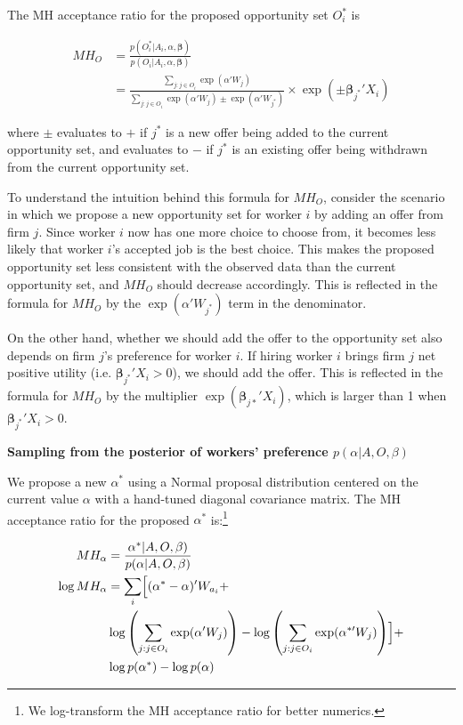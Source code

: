 The MH acceptance ratio for the proposed opportunity set $O_i^*$ is

\begin{align}
  MH_O &= \frac{p(O_i^* | A_i, \alpha, \bm{\beta})}{p(O_i | A_i, \alpha, \bm{\beta})} \\
       &= \frac{\sum\limits_{j:j \in O_i} \exp(\alpha'W_j)}{\sum\limits_{j:j \in O_i} \exp(\alpha'W_j) \pm \exp(\alpha' W_{j^*})} \times \exp(\pm \bm{\beta}_{j^*}'X_i)
\end{align}

where $\pm$ evaluates to $+$ if $j^*$ is a new offer being added to the current
opportunity set, and evaluates to $-$ if $j^*$ is an existing offer being
withdrawn from the current opportunity set.

To understand the intuition behind this formula for $MH_O$, consider the
scenario in which we propose a new opportunity set for worker $i$ by adding an
offer from firm $j$. Since worker $i$ now has one more choice to choose from, it
becomes less likely that worker $i$'s accepted job is the best choice. This
makes the proposed opportunity set less consistent with the observed data than
the current opportunity set, and $MH_O$ should decrease accordingly. This is
reflected in the formula for $MH_O$ by the $\exp(\alpha'W_{j^*})$ term in the
denominator.

On the other hand, whether we should add the offer to the opportunity set also
depends on firm $j$'s preference for worker $i$. If hiring worker $i$ brings
firm $j$ net positive utility (i.e. $\bm{\beta}_{j^*}'X_i > 0$), we should add
the offer. This is reflected in the formula for $MH_O$ by the multiplier
$\exp(\bm{\beta}_{j*}'X_i)$, which is larger than 1 when $\bm{\beta}_{j^*}'X_i >
0$.

\textbf{Sampling from the posterior of workers' preference $p(\alpha|A, O,
  \beta)$}

We propose a new $\alpha^*$ using a Normal proposal distribution centered on the
current value $\alpha$ with a hand-tuned diagonal covariance matrix. The MH
acceptance ratio for the proposed $\alpha^*$ is:\footnote{We log-transform the
  MH acceptance ratio for better numerics.}

\begin{align}
  MH_\alpha &= \frac{\alpha^*|A, O, \beta)}{p(\alpha | A, O, \beta)} \\
  \log MH_\alpha &= \sum_i \Bigl[ (\alpha^* - \alpha)' W_{a_i} + \nonumber \\
            & \log\left(\sum\limits_{j:j \in O_i} \exp(\alpha' W_j)\right) -
              \log\left(\sum\limits_{j:j \in O_i} \exp(\alpha^{*\prime} W_j)\right) \Bigr] + \nonumber\\
            & \log p(\alpha^*) - \log p(\alpha)
\end{align}


